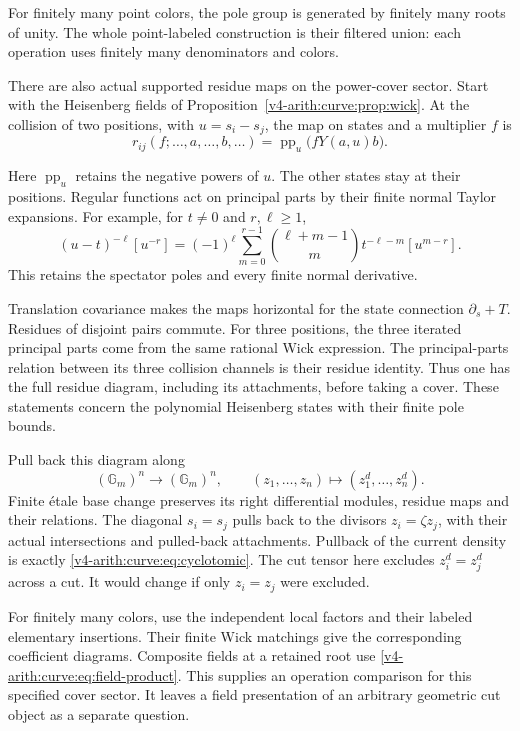 For finitely many point colors, the pole group is generated by
finitely many roots of unity. The whole point-labeled construction
is their filtered union: each operation uses finitely many
denominators and colors.

There are also actual supported residue maps on the power-cover
sector. Start with the Heisenberg fields of
Proposition~\ref{v4-arith:curve:prop:wick}. At the collision of two
positions, with $u=s_i-s_j$, the map on states and a multiplier $f$
is
\begin{equation}\label{v4-arith:curve:eq:residue}
 r_{ij}(f;\ldots,a,\ldots,b,\ldots)
 =\operatorname{pp}_u\bigl(fY(a,u)b\bigr).
\end{equation}

Here $\operatorname{pp}_u$ retains the negative powers of $u$.
The other states stay at their positions. Regular functions act
on principal parts by their finite normal Taylor expansions. For
example, for $t\ne0$ and $r,\ell\geq1$,
\[
 (u-t)^{-\ell}[u^{-r}]
 =(-1)^\ell\sum_{m=0}^{r-1}
   \binom{\ell+m-1}{m}t^{-\ell-m}[u^{m-r}].
\]
This retains the spectator poles and every finite normal derivative.

Translation covariance makes the maps horizontal for the state
connection $\partial_s+T$. Residues of disjoint pairs commute.
For three positions, the three iterated principal parts come from
the same rational Wick expression. The principal-parts relation
between its three collision channels is their residue identity.
Thus one has the full residue diagram, including its attachments,
before taking a cover. These statements concern the polynomial
Heisenberg states with their finite pole bounds.

Pull back this diagram along
\[
 (\mathbb G_m)^n\longrightarrow(\mathbb G_m)^n,\qquad
 (z_1,\ldots,z_n)\longmapsto(z_1^d,\ldots,z_n^d).
\]
Finite étale base change preserves its right differential modules,
residue maps and their relations. The diagonal $s_i=s_j$ pulls
back to the divisors $z_i=\zeta z_j$, with their actual
intersections and pulled-back attachments. Pullback of the
current density is exactly \eqref{v4-arith:curve:eq:cyclotomic}.
The cut tensor here excludes $z_i^d=z_j^d$ across a cut.
It would change if only $z_i=z_j$ were excluded.

For finitely many colors, use the independent local factors and
their labeled elementary insertions. Their finite Wick matchings
give the corresponding coefficient diagrams. Composite fields at
a retained root use \eqref{v4-arith:curve:eq:field-product}.
This supplies an operation comparison for this specified cover
sector. It leaves a field presentation of an arbitrary geometric
cut object as a separate question.

